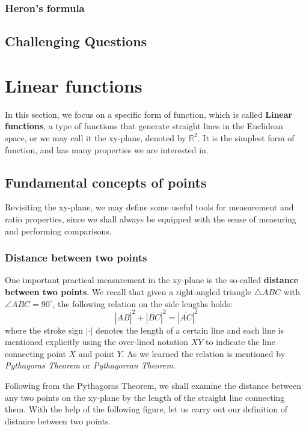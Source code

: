\documentclass[12pt]{article}
\begin{document}
    \subsubsection{Heron's formula}

    \subsection{Challenging Questions}

    \newpage

    \section{Linear functions}

    In this section, we focus on a specific form of function, which is called \textbf{Linear functions}, a type of functions that generate straight lines in the Euclidean space, or we may call it the xy-plane, denoted by $\mathbb{R}^2$. It is the simplest form of function, and has many properties we are interested in.

    \subsection{Fundamental concepts of points}

    Revisiting the xy-plane, we may define some useful tools for measurement and ratio properties, since we shall always be equipped with the sense of measuring and performing comparisons.

    \subsubsection{Distance between two points}

    One important practical measurement in the xy-plane is the so-called \textbf{distance between two points}. We recall that given a right-angled triangle $\triangle ABC$ with $\angle ABC = 90^\circ$, the following relation on the side lengths holds: $$|\overline{AB}|^2+|\overline{BC}|^2=|\overline{AC}|^2$$ where the stroke sign $|\cdot|$ denotes the length of a certain line and each line is mentioned explicitly using the over-lined notation $\overline{XY}$ to indicate the line connecting point $X$ and point $Y$. As we learned the relation is mentioned by \textit{Pythagoras Theorem} or \textit{Pythagorean Theorem}.
    
    Following from the Pythagoras Theorem, we shall examine the distance between any two points on the xy-plane by the length of the straight line connecting them. With the help of the following figure, let us carry out our definition of distance between two points.
\end{document}
